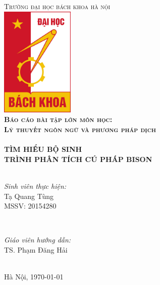\documentclass[../report.tex]{subfiles}
\begin{document}
\begin{titlepage}

\center
 
\textsc{\LARGE Trường đại học bách khoa hà nội}\\[1cm] %
\includegraphics[width=3.5cm]{figures/hust.jpg}\\[1cm] %
 
\textsc{\LARGE\bfseries Báo cáo bài tập lớn môn học:} \\[0.2cm]
\textsc{\huge\bfseries Lý thuyết ngôn ngữ và phương pháp dịch}\\[1cm] %

\HRule \\[0.4cm]
{\LARGE\bfseries TÌM HIỂU BỘ SINH \\TRÌNH PHÂN TÍCH CÚ PHÁP BISON}\\[0.3cm] %
\HRule \\[1.5cm]

\begin{minipage}{0.4\textwidth}
\begin{flushleft} \large
\emph{Sinh viên thực hiện:}\\
Tạ Quang Tùng \\ 
MSSV: 20154280
\end{flushleft}
\end{minipage}
~
\begin{minipage}{0.4\textwidth}
\begin{flushright} \large
\emph{Giáo viên hướng dẫn:} \\
TS. Phạm Đăng Hải
\end{flushright}
\end{minipage}\\[5cm]

{\large Hà Nội, \today}\\[1cm] %

\vfill %

\end{titlepage}
\end{document}
